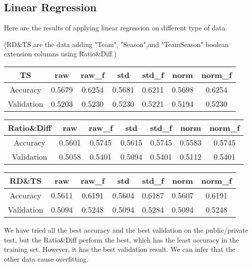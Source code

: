 \subsection*{Linear Regression}

Here are the results of applying linear regression on different type of data.

\noindent
(RD\&TS are the data adding "Team", "Season",and "TeamSeason" boolean extension columns using Ratio\&Diff.) \\

\vspace{6pt}

\begin{tabular}{|c|c|c|c|c|c|c|}
    \hline
    TS         & raw    & raw\_f & std    & std\_f & norm   & norm\_f \\\hline
    Accuracy   & 0.5679 & 0.6254 & 0.5681 & 0.6211 & 0.5698 & 0.6254 \\\hline
    Validation & 0.5203 & 0.5230 & 0.5230 & 0.5221 & 0.5194 & 0.5230 \\\hline
\end{tabular}

\vspace{12pt}

\begin{tabular}{|c|c|c|c|c|c|c|}
    \hline
    Ratio\&Diff& raw    & raw\_f & std    & std\_f & norm   & norm\_f \\\hline
    Accuracy   & 0.5601 & 0.5745 & 0.5615 & 0.5745 & 0.5583 & 0.5745 \\\hline
    Validation & 0.5058 & 0.5401 & 0.5094 & 0.5401 & 0.5112 & 0.5401 \\\hline
\end{tabular}

\vspace{12pt}

\begin{tabular}{|c|c|c|c|c|c|c|}
    \hline
    RD\&TS     & raw    & raw\_f & std    & std\_f & norm   & norm\_f \\\hline
    Accuracy   & 0.5611 & 0.6191 & 0.5604 & 0.6187 & 0.5607 & 0.6191  \\\hline
    Validation & 0.5094 & 0.5248 & 0.5094 & 0.5284 & 0.5094 & 0.5248 \\\hline
\end{tabular}

\vspace{6pt}

We have tried all the best accuracy and the best validation on the public/private test, but the Ratio\&Diff perform the best, which has the least accuracy in the training set. However, it has the best validation result. We can infer that the other data cause overfitting.